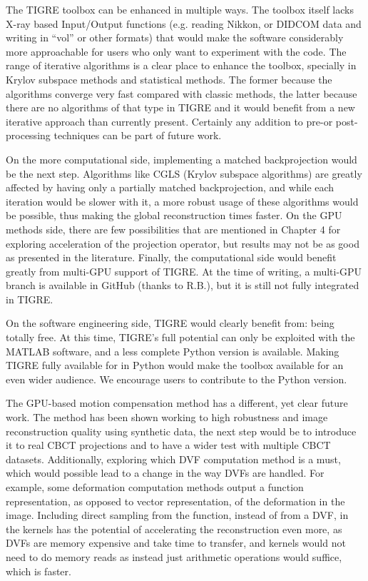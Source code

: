 The TIGRE toolbox can be enhanced in multiple ways. The toolbox itself lacks X-ray based Input/Output functions (e.g. reading Nikkon, or DIDCOM data and writing in ``vol'' or other formats) that would make the software considerably more approachable for users who only want to experiment with the code. The range of iterative algorithms is a clear place to enhance the toolbox, specially in Krylov subspace methods and statistical methods. The former because the algorithms converge very fast compared with classic methods, the latter because there are no algorithms of that type in TIGRE and it would benefit from a new iterative approach than currently present. Certainly any addition to pre-or post-processing techniques can be part of future work.

On the more computational side, implementing a matched backprojection would be the next step. Algorithms like CGLS (Krylov subspace algorithms) are greatly affected by having only a partially matched backprojection, and while each iteration would be slower with it, a more robust usage of these algorithms would be possible, thus making the global reconstruction times faster. On the GPU methods side, there are few possibilities that are mentioned in Chapter 4 for exploring acceleration of the projection operator, but results may not be as good as presented in the literature. Finally, the computational side would benefit greatly from multi-GPU support of TIGRE. At the time of writing, a multi-GPU branch is available in GitHub (thanks to R.B.), but it is still not fully integrated in TIGRE.

On the software engineering side, TIGRE would clearly benefit from: being totally free. At this time, TIGRE's full potential can only be exploited with the MATLAB software, and a less complete Python version is available. Making TIGRE fully available for in Python would make the toolbox available for an even wider audience. We encourage users to contribute to the Python version.

The GPU-based motion compensation method has a different, yet clear future work. The method has been shown working to high robustness and image reconstruction quality using synthetic data, the next step would be to introduce it to real CBCT projections and to have a wider test with multiple CBCT datasets. Additionally, exploring which DVF computation method is a must, which would possible lead to a change in the way DVFs are handled. For example, some deformation computation methods output a function representation, as opposed to vector representation, of the deformation in the image. Including direct sampling from the function, instead of from a DVF, in the kernels has the potential of accelerating the reconstruction even more, as DVFs are memory expensive and take time to transfer, and kernels would not need to do memory reads as instead just arithmetic operations would suffice, which is faster.

